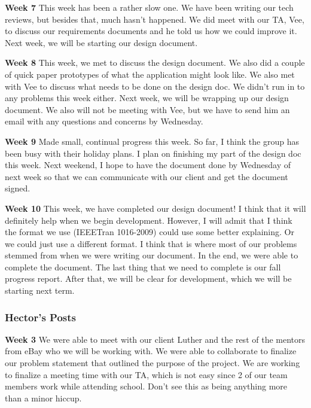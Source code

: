 \documentclass[journal,compsoc, 10pt, draftclsnofoot, onecolumn]{IEEEtran}
\begin{document}
\textbf{Week 7}\newline
This week has been a rather slow one. We have been writing our tech reviews, but 
besides that, much hasn't happened. We did meet with our TA, Vee, to discuss 
our requirements documents and he told us how we could improve it. Next week, 
we will be starting our design document.\newline

\textbf{Week 8}\newline
This week, we met to discuss the design document. We also did a couple of quick 
paper prototypes of what the application might look like. We also met with Vee 
to discuss what needs to be done on the design doc. We didn't run in to any 
problems this week either. Next week, we will be wrapping up our design 
document. We also will not be meeting with Vee, but we have to send him an 
email with any questions and concerns by Wednesday.\newline

\textbf{Week 9}\newline
Made small, continual progress this week. So far, I think the group has been 
busy with their holiday plans. I plan on finishing my part of the design doc 
this week. Next weekend, I hope to have the document done by Wednesday 
of next week so that we can communicate with our client and get the
 document signed.\newline

\textbf{Week 10}\newline
This week, we have completed our design document! I think that it will definitely 
help when we begin development. However, I will admit that I think the 
format we use (IEEETran 1016-2009) could use some better explaining.
 Or we could just use a different format. I think that is where most of 
 our problems stemmed from when we were writing our document. In the 
 end, we were able to complete the document. The last thing that we need 
 to complete is our fall progress report. After that, we will be clear for 
 development, which we will be starting next term.\newline

\subsubsection*{Hector's Posts}
\textbf{Week 3}\newline
We were able to meet with our client Luther and the rest of the mentors from eBay who 
we will be working with. We were able to collaborate to finalize our problem statement 
that outlined the purpose of the project. We are working to finalize a meeting time with
 our TA, which is not easy since 2 of our team members work while attending school.
  Don't see this as being anything more than a minor hiccup.\newline
\end{document}
